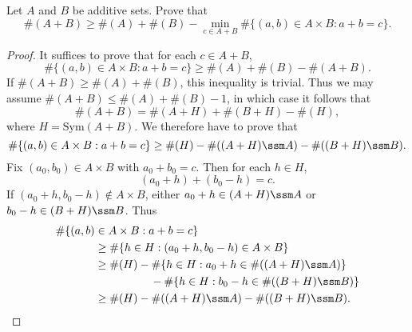 \begin{theorem}
    Let $A$ and $B$ be additive sets. Prove that
    \[ \#(A + B) \geq \#(A) + \#(B) - \min_{c \in A + B} \# \{ (a,b) \in A \times B: a + b = c \}. \]
\end{theorem}
\begin{proof}
    It suffices to prove that for each $c \in A + B$,
    \[ \# \{ (a,b) \in A \times B: a + b = c \} \geq \#(A) + \#(B) - \#(A + B). \]
    If $\#(A + B) \geq \#(A) + \#(B)$, this inequality is trivial. Thus we may assume $\#(A + B) \leq \#(A) + \#(B) - 1$, in which case it follows that
    \[ \#(A + B) = \#(A + H) + \#(B + H) - \#(H), \]
    where $H = \text{Sym}(A + B)$. We therefore have to prove that
    \[ \# \{ (a,b) \in A \times B: a + b = c \} \geq \#(H) - \#((A + H) \ssm A) - \#((B + H) \ssm B). \]
    Fix $(a_0,b_0) \in A \times B$ with $a_0 + b_0 = c$. Then for each $h \in H$,
    \[ (a_0 + h) + (b_0 - h) = c. \]
    If $(a_0 + h, b_0 - h) \not \in A \times B$, either $a_0 + h \in (A + H) \ssm A$ or $b_0 - h \in (B + H) \ssm B$. Thus
    \begin{align*}
        \# \{ (a,b) &\in A \times B: a + b = c \}\\
        &\geq \# \{ h \in H : (a_0+h,b_0-h) \in A \times B \} \\
        &\geq \#(H) - \# \{ h \in H : a_0 + h \in \#((A + H) \ssm A) \}\\
        &\quad\quad\quad\quad\quad - \# \{ h \in H : b_0 - h \in \#((B + H) \ssm B) \}\\
        &\geq \#(H) - \#((A + H) \ssm A) - \#((B + H) \ssm B). \qedhere
    \end{align*}
\end{proof}

